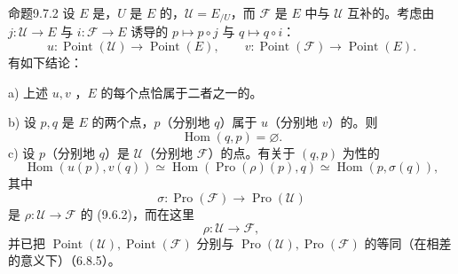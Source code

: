 \begin{SGAresult}{命题}{9.7.2}
设 $E$ 是，$U$ 是 $E$ 的，$\mathscr U=E_{/U}$，而 $\mathscr F$ 是 $E$ 中与 $\mathscr U$ 互补的。考虑由 $j:\mathscr U\to E$ 与 $i:\mathscr F\to E$ 诱导的 $p\mapsto p\circ j$ 与 $q\mapsto q\circ i$：
\[
u:\operatorname{Point}(\mathscr U)\longrightarrow\operatorname{Point}(E),\qquad
v:\operatorname{Point}(\mathscr F)\longrightarrow\operatorname{Point}(E).\tag{9.7.2.1}
\]
有如下结论：

a) 上述 $u,v$ ，$E$ 的每个点恰属于二者之一的。

b) 设 $p,q$ 是 $E$ 的两个点，$p$（分别地 $q$）属于 $u$（分别地 $v$）的。则
\[
\operatorname{Hom}(q,p)=\varnothing.\tag{9.7.2.2}
\]
c) 设 $p$（分别地 $q$）是 $\mathscr U$（分别地 $\mathscr F$）的点。有关于 $(q,p)$ 为性的
\[
\operatorname{Hom}(u(p),v(q))\simeq\operatorname{Hom}(\operatorname{Pro}(\rho)(p),q)\simeq\operatorname{Hom}(p,\sigma(q)),\tag{9.7.2.3}
\]
其中
\[
\sigma:\operatorname{Pro}(\mathscr F)\longrightarrow\operatorname{Pro}(\mathscr U)
\]
是 $\rho:\mathscr U\to\mathscr F$ 的  (9.6.2)，而在这里
\[
\rho:\mathscr U\longrightarrow\mathscr F,
\]
并已把 $\operatorname{Point}(\mathscr U),\operatorname{Point}(\mathscr F)$ 分别与 $\operatorname{Pro}(\mathscr U),\operatorname{Pro}(\mathscr F)$ 的等同（在相差的意义下）（6.8.5）。
\end{SGAresult}
